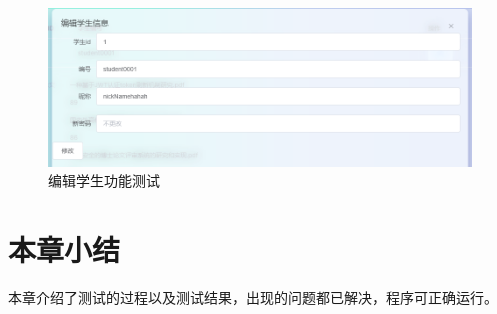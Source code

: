 \begin{figure}[htbp]
  \centering
  \includegraphics[scale = 0.6]{out/figure/测试/manage-edit-student-test.png}
  \caption{\song\wuhao 编辑学生功能测试}
  \label{manage-edit-student-test}
\end{figure}

\section{本章小结}

本章介绍了测试的过程以及测试结果，出现的问题都已解决，程序可正确运行。